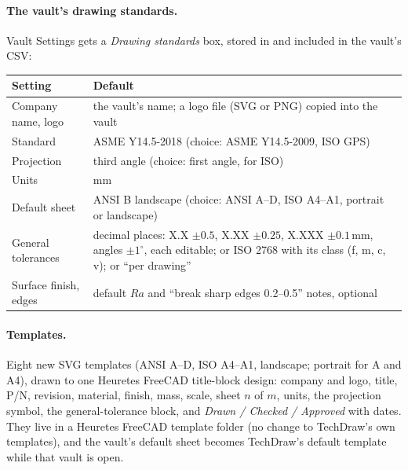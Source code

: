 \paragraph{The vault's drawing standards.} Vault Settings gets a \emph{Drawing standards} box, stored in
 and included in the vault's CSV:
\begin{center}
\small
\begin{tabularx}{\linewidth}{@{}lX@{}}
\toprule
Setting & Default\\
\midrule
Company name, logo & the vault's name; a logo file (SVG or PNG) copied into the vault\\
Standard & ASME Y14.5-2018 (choice: ASME Y14.5-2009, ISO GPS)\\
Projection & third angle (choice: first angle, for ISO)\\
Units & mm\\
Default sheet & ANSI B landscape (choice: ANSI A--D, ISO A4--A1, portrait or landscape)\\
General tolerances & decimal places: X.X $\pm0.5$, X.XX $\pm0.25$, X.XXX $\pm0.1$\,mm, angles $\pm1^\circ$, each
  editable; or ISO 2768 with its class (f, m, c, v); or ``per drawing''\\
Surface finish, edges & default $Ra$ and ``break sharp edges 0.2--0.5'' notes, optional\\
\bottomrule
\end{tabularx}
\end{center}

\paragraph{Templates.} Eight new SVG templates (ANSI A--D, ISO A4--A1, landscape; portrait for A and A4), drawn to one
Heuretes FreeCAD title-block design: company and logo, title, P/N, revision, material, finish, mass, scale, sheet $n$ of $m$,
units, the projection symbol, the general-tolerance block, and \emph{Drawn / Checked / Approved} with dates. They live in
a Heuretes FreeCAD template folder (no change to TechDraw's own templates), and the vault's default sheet becomes TechDraw's
default template while that vault is open.

